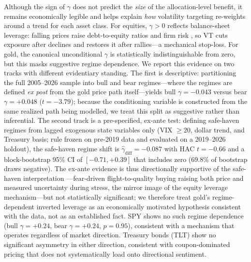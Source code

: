 Although the sign of $\gamma$ does not predict the \emph{size} of the allocation-level benefit, it remains economically legible and helps explain \emph{how} volatility targeting re-weights around a trend for each asset class. For equities, $\gamma>0$ reflects balance-sheet leverage: falling prices raise debt-to-equity ratios and firm risk \citep{black1976,christie1982}, so VT cuts exposure after declines and restores it after rallies---a mechanical stop-loss. For gold, the canonical unconditional $\gamma$ is statistically indistinguishable from zero, but this masks suggestive regime dependence. We report this evidence on two tracks with different evidentiary standing. The first is descriptive: partitioning the full 2005--2026 sample into bull and bear regimes---where the regimes are defined \emph{ex post} from the gold price path itself---yields bull $\gamma=-0.043$ versus bear $\gamma=+0.048$ ($t=-3.79$); because the conditioning variable is constructed from the same realized path being modelled, we treat this split as suggestive rather than inferential. The second track is a pre-specified, ex-ante test: defining safe-haven regimes from lagged exogenous state variables only (VIX $\ge 20$, dollar trend, and Treasury basis; rule frozen on pre-2019 data and evaluated on a 2019--2026 holdout), the safe-haven regime shift is $\hat{\gamma}_{\text{diff}}=-0.087$ with HAC $t=-0.66$ and a block-bootstrap 95\% CI of $[-0.71, +0.39]$ that includes zero (69.8\% of bootstrap draws negative).%
 The ex-ante evidence is thus directionally supportive of the safe-haven interpretation \citep{baur2010safe,baur2010hedge}---fear-driven flight-to-quality buying raising both price and measured uncertainty during stress, the mirror image of the equity leverage mechanism---but not statistically significant; we therefore treat gold's regime-dependent inverted leverage as an economically motivated hypothesis consistent with the data, not as an established fact. SPY shows no such regime dependence (bull $\gamma=+0.24$, bear $\gamma=+0.24$, $p=0.95$), consistent with a mechanism that operates regardless of market direction. Treasury bonds (TLT) show no significant asymmetry in either direction, consistent with coupon-dominated pricing that does not systematically load onto directional sentiment.

